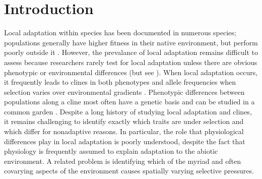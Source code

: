 \documentclass[11pt, oneside]{article}
\begin{document}
\section*{Introduction}

\linenumbers

Local adaptation within species has been documented in numerous species; populations generally have higher fitness in their native environment, but perform poorly outside it \citep{Schluter_2000, Leimu_Fischer_2008, Hereford_2009}. However, the prevalance of local adaptation remains difficult to assess because researchers rarely test for local adaptation unless there are obvious phenotypic or environmental differences (but see \citeauthor{Hereford_Winn_2008} \citeyear{Hereford_Winn_2008}). When local adaptation occurs, it frequently leads to clines in both phenotypes and allele frequencies when selection varies over environmental gradients \citep{Huxley_1938, Endler_1977, Barton_1999}. Phenotypic differences between populations along a cline most often have a genetic basis and can be studied in a common garden \citep{Turesson_1922, Clausen_etal_1940, Hiesey_etal_1942}. Despite a long history of studying local adaptation and clines, it remains challenging to identify exactly which traits are under selection and which differ for nonadaptive reasons. In particular, the role that physiological differences play in local adaptation is poorly understood, despite the fact that physiology is frequently assumed to explain adaptation to the abiotic environment. A related problem is identifying which of the myriad and often covarying aspects of the environment causes spatially varying selective pressures. 
\end{document}
